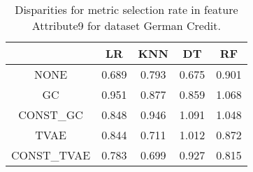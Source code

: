 \begin{table}
\caption{Disparities for metric selection rate in feature Attribute9 for dataset German Credit.}
\label{tab:disp-GERMAN CREDIT-Attribute9-selection_rate}
\begin{tabular}{ccccc}
\toprule
 & LR & KNN & DT & RF \\
\midrule
NONE & 0.689 & 0.793 & 0.675 & 0.901 \\
GC & 0.951 & 0.877 & 0.859 & 1.068 \\
CONST\_GC & 0.848 & 0.946 & 1.091 & 1.048 \\
TVAE & 0.844 & 0.711 & 1.012 & 0.872 \\
CONST\_TVAE & 0.783 & 0.699 & 0.927 & 0.815 \\
\bottomrule
\end{tabular}
\end{table}
